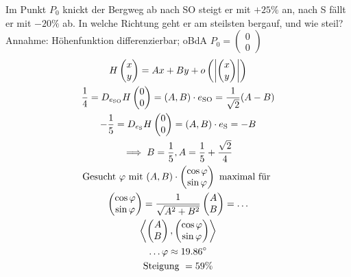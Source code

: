 \begin{bsp}
	Im Punkt $P_0$ knickt der Bergweg ab nach SO steigt er mit $+25\%$ an, nach S fällt er mit $-20\%$ ab. In welche Richtung geht er am steilsten bergauf, und wie steil? \\
	Annahme: Höhenfunktion differenzierbar; oBdA $P_0 = \begin{pmatrix} 0 \\ 0 \end{pmatrix}$
	\begin{gather*}
		H\begin{pmatrix} x \\ y \end{pmatrix} = Ax + By + o\left( \abs{\begin{pmatrix} x \\ y \end{pmatrix}} \right) \\
		\frac{1}{4} = D_{e_{\text{SO}}} H\begin{pmatrix} 0 \\ 0 \end{pmatrix} = (A,B) \cdot e_{\text{SO}} = \frac{1}{\sqrt{2}} (A-B) \\
		-\frac{1}{5} = D_{e_{\text{S}}} H\begin{pmatrix} 0 \\ 0 \end{pmatrix} = (A,B) \cdot e_{\text{S}} = -B \\
		\implies B = \frac{1}{5} , A = \frac{1}{5} + \frac{\sqrt{2}}{4} \\
		\text{Gesucht $\varphi$ mit } (A,B) \cdot \begin{pmatrix} \cos\varphi \\ \sin\varphi \end{pmatrix} \text{ maximal für } \\
		\begin{pmatrix} \cos\varphi \\ \sin\varphi \end{pmatrix} = \frac{1}{\sqrt{A^2+B^2}} \begin{pmatrix} A \\ B \end{pmatrix} = \dots \\
		\left\langle \begin{pmatrix} A \\ B \end{pmatrix} , \begin{pmatrix} \cos\varphi \\ \sin\varphi \end{pmatrix} \right\rangle \\
		\dots \varphi \approx 19.86^\circ \\
		\text{Steigung } = 59\%
	\end{gather*}
\end{bsp}
